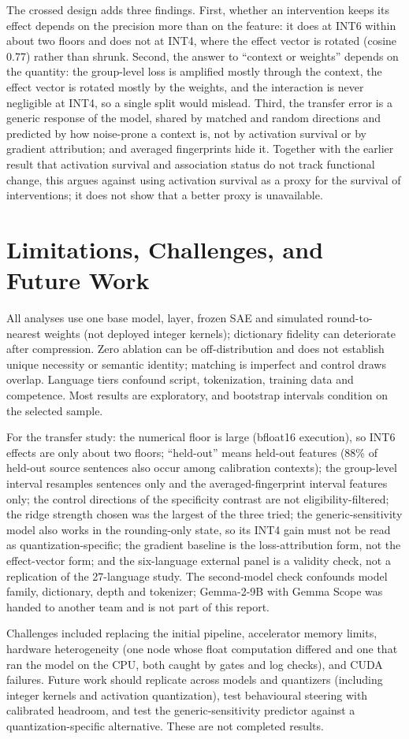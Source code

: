 The crossed design adds three findings. First, whether an intervention keeps its effect depends on the precision more than on the feature: it does at INT6 within about two floors and does not at INT4, where the effect vector is rotated (cosine 0.77) rather than shrunk. Second, the answer to ``context or weights'' depends on the quantity: the group-level loss is amplified mostly through the context, the effect vector is rotated mostly by the weights, and the interaction is never negligible at INT4, so a single split would mislead. Third, the transfer error is a generic response of the model, shared by matched and random directions and predicted by how noise-prone a context is, not by activation survival or by gradient attribution; and averaged fingerprints hide it. Together with the earlier result that activation survival and association status do not track functional change, this argues against using activation survival as a proxy for the survival of interventions; it does not show that a better proxy is unavailable.

\label{main-content-end}
\section*{Limitations, Challenges, and Future Work}
All analyses use one base model, layer, frozen SAE and simulated round-to-nearest weights (not deployed integer kernels); dictionary fidelity can deteriorate after compression. Zero ablation can be off-distribution and does not establish unique necessity or semantic identity; matching is imperfect and control draws overlap. Language tiers confound script, tokenization, training data and competence. Most results are exploratory, and bootstrap intervals condition on the selected sample.

For the transfer study: the numerical floor is large (bfloat16 execution), so INT6 effects are only about two floors; ``held-out'' means held-out features (88\% of held-out source sentences also occur among calibration contexts); the group-level interval resamples sentences only and the averaged-fingerprint interval features only; the control directions of the specificity contrast are not eligibility-filtered; the ridge strength chosen was the largest of the three tried; the generic-sensitivity model also works in the rounding-only state, so its INT4 gain must not be read as quantization-specific; the gradient baseline is the loss-attribution form, not the effect-vector form; and the six-language external panel is a validity check, not a replication of the 27-language study. The second-model check confounds model family, dictionary, depth and tokenizer; Gemma-2-9B with Gemma Scope was handed to another team and is not part of this report.

Challenges included replacing the initial pipeline, accelerator memory limits, hardware heterogeneity (one node whose float computation differed and one that ran the model on the CPU, both caught by gates and log checks), and CUDA failures. Future work should replicate across models and quantizers (including integer kernels and activation quantization), test behavioural steering with calibrated headroom, and test the generic-sensitivity predictor against a quantization-specific alternative. These are not completed results.
